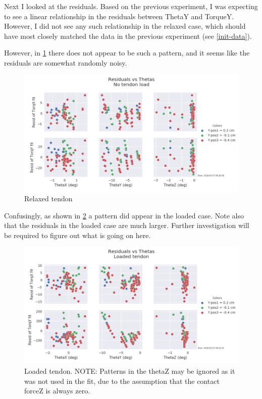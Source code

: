 \documentclass[preprint,12pt,3p]{elsarticle}
\begin{document}
Next I looked at the residuals. Based on the previous experiment, I was expecting to see a linear
relationship in the residuals between ThetaY and TorqueY. However, I did not see any such
relationship in the relaxed case, which should have most closely matched the data in the previous
experiment (see \cref{init-data}).


However, in \cref{fig:nopattern} there does not appear to be such a pattern, and it seems like the
residuals are somewhat randomly noisy.

\begin{figure}[H]
\centering
\includegraphics[width=.9\textwidth]{images/stiff/GOODResid_vs_Theta.png}
\caption{Relaxed tendon}
\label{fig:nopattern}
\end{figure}

Confusingly, as shown in \cref{fig:yespattern} a pattern did appear in the loaded case. Note also that the residuals in the loaded case
are much larger. Further investigation will be required to figure out what is going on here.

\begin{figure}[H]
\centering
\includegraphics[width=.8\textwidth]{images/stiff/GOODResid_vs_Theta_loaded.png}
\caption{Loaded tendon. NOTE: Patterns in the thetaZ may be ignored as it was not used in the fit,
    due to the assumption that the contact forceZ is always zero.  }
\label{fig:yespattern}
\end{figure}
\end{document}
